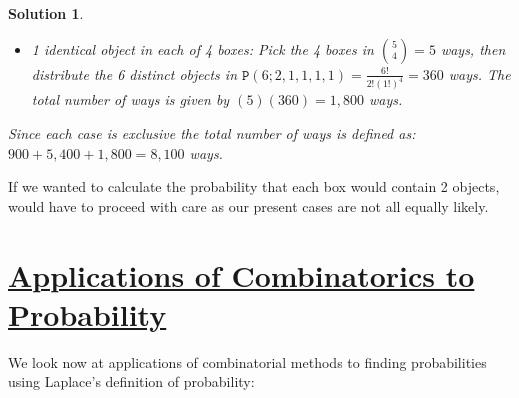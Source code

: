 \documentclass[12pt, letterpaper, onecolumn, conference, final]{IEEEtran}
\theoremstyle{definition}
\theoremstyle{plain}
\newtheorem{solution}{Solution}[section]
\begin{document}
\begin{solution}
\begin{itemize}
\begin{itemize}
\vspace{.2cm}
\item[(iii)]
1 identical object in each of 4 boxes: Pick the 4 boxes in ${5 \choose 4} = 5$ ways, then distribute the 6 distinct objects in $\mathtt{P}(6;2,1,1,1,1) = \frac{6!}{2!(1!)^4} = 360$ ways. The total number of ways is given by $(5)(360) = 1,800$ ways.

\end{itemize}
Since each case is exclusive the total number of ways is defined as: $900 + 5,400 + 1,800 = 8,100$ ways.

\end{itemize}
\end{solution}

\noindent
If we wanted to calculate the probability that each box would contain 2 objects, would have to proceed with care as our present cases are not all equally likely.

\newpage
\section{\textbf{\underline{Applications of Combinatorics to Probability}}}
\vspace{.3cm}
\noindent
We look now at applications of combinatorial methods to finding probabilities using Laplace's definition of probability:
\end{document}
